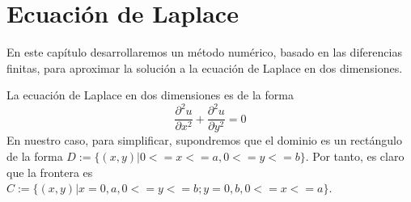 \chapter{Ecuación de Laplace}
\label{cap:laplace}

\begin{resumen}
	En este capítulo desarrollaremos un método numérico, basado en las diferencias finitas, para aproximar la solución a la ecuación de Laplace en dos dimensiones.
\end{resumen}

La ecuación de Laplace en dos dimensiones es de la forma
\begin{equation} \label{eq:laplace_eq}
	\frac{\partial^2u}{\partial x^2} + \frac{\partial^2u}{\partial y^2} = 0
\end{equation}
En nuestro caso, para simplificar, supondremos que el dominio es un rectángulo de la forma $D:=\{(x,y)|0<=x<=a, 0<=y<=b\}$. Por tanto, es claro que la frontera es $C:=\{(x,y)|x=0,a, 0<=y<=b;y=0,b, 0<=x<=a\}$.
